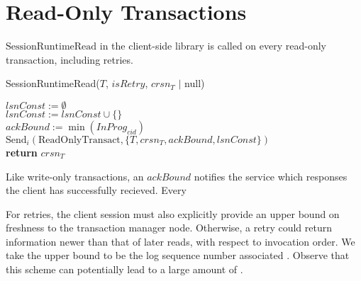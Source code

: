 \documentclass{article}
\begin{document}
\section{Read-Only Transactions} \label{rotxn}
 $\text{SessionRuntimeRead}$ in the client-side library is called on every read-only transaction, including retries.   \\
\begin{procedure}[H]
  \caption{SessionRuntimeRead($T$, $isRetry$, $crsn_T$ $|$ null)}
  $lsnConst := \emptyset$\\
   
  $lsnConst := lsnConst \cup \{ \}$ \\
  $ackBound := \min(InProg_{cid})$ \\
  $\text{Send}_{i}(\text{ReadOnlyTransact}, \{T, crsn_T, ackBound, lsnConst\})$ \\
  \textbf{return} $crsn_T$
\end{procedure}
Like write-only transactions, an $ackBound$ notifies the service which responses the client has successfully recieved. Every 

For retries, the client session must also explicitly provide an upper bound on freshness to the transaction manager node. Otherwise, a retry could return information newer than that of later reads, with respect to invocation order. We take the upper bound to be the log sequence number associated . Observe that this scheme can potentially lead to a large amount of .  



\end{document}

